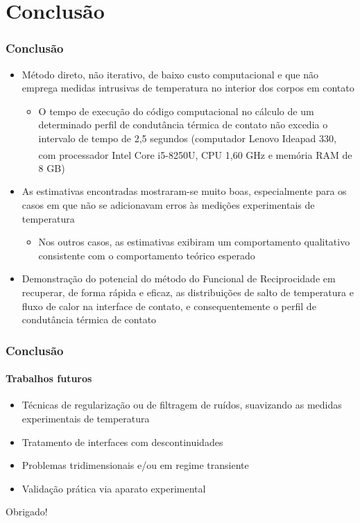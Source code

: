 \documentclass{beamer}
\begin{document}
\section{Conclusão}
\begin{frame}
	\frametitle{Conclusão}
	\begin{itemize}
		\item Método direto, não iterativo, de baixo custo computacional e que não emprega medidas intrusivas de temperatura no interior dos corpos em contato
		\begin{itemize}
			\item O tempo de execução do código computacional no cálculo de um determinado perfil de condutância térmica de contato não excedia o intervalo de tempo de 2,5 segundos (computador Lenovo Ideapad 330, com processador Intel Core\textsuperscript{\texttrademark} i5-8250U, CPU 1,60 GHz e memória RAM de 8 GB)
		\end{itemize}
	\pause
		\item As estimativas encontradas mostraram-se muito boas, especialmente para os casos em que não se adicionavam erros às medições experimentais de temperatura
		\begin{itemize}
			\item Nos outros casos, as estimativas exibiram um comportamento qualitativo consistente com o comportamento teórico esperado
		\end{itemize}
	\pause
		\item Demonstração do potencial do método do Funcional de Reciprocidade em recuperar, de forma rápida e eficaz, as distribuições de salto de temperatura e fluxo de calor na interface de contato, e consequentemente o perfil de condutância térmica de contato
	\end{itemize}
\end{frame}

\begin{frame}
	\frametitle{Conclusão}
	\framesubtitle{Trabalhos futuros}
	\begin{itemize}
		\item Técnicas de regularização ou de filtragem de ruídos, suavizando as medidas experimentais de temperatura
		\pause
		\item Tratamento de interfaces com descontinuidades
		\pause
		\item Problemas tridimensionais e/ou em regime transiente
		\pause
		\item Validação prática via aparato experimental
	\end{itemize}
\end{frame}	

\begin{frame}
	\centering
	Obrigado!
\end{frame}

	
\end{document}
